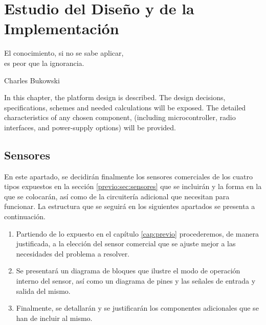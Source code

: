 %
%

\chapter{Estudio del Diseño y de la Implementación}
\label{cap:diseno}

\begin{FraseCelebre}
\begin{Frase}
El conocimiento, si no se sabe aplicar,\\
es peor que la ignorancia.
\end{Frase}
\begin{Fuente}
Charles Bukowski
\end{Fuente}
\end{FraseCelebre}

\begin{resumen}
In this chapter, the platform design is described. The design decisions, specifications, schemes and needed calculations will be exposed.
The detailed characteristics of any chosen component, (including microcontroller, radio interfaces, and power-supply options) will be provided.
\end{resumen}


\section{Sensores}
\label{diseno:sec:sensores}

En este apartado, se decidirán finalmente los sensores comerciales de los cuatro tipos expuestos en la sección \ref{previo:sec:sensores} que se incluirán y la forma en la que se colocarán, así como de la circuitería adicional que necesitan para funcionar. La estructura que se seguirá en los siguientes apartados se presenta a continuación.

\begin{enumerate}

\item Partiendo de lo expuesto en el capítulo \ref{cap:previo} procederemos, de manera justificada, a la elección del sensor comercial que se ajuste mejor a las necesidades del problema a resolver.
\item Se presentará un diagrama de bloques que ilustre el modo de operación interno del sensor, así como un diagrama de pines y las señales de entrada y salida del mismo.
\item Finalmente, se detallarán y se justificarán los componentes adicionales que se han de incluir al mismo.

\end{enumerate}

